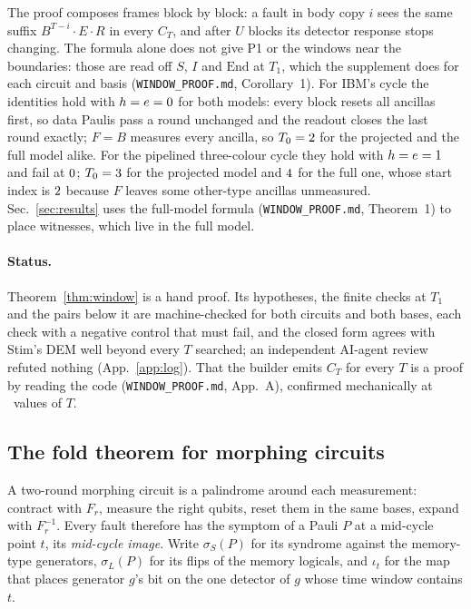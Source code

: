 \documentclass[aps,pra,twocolumn,superscriptaddress,nofootinbib,longbibliography,floatfix]{revtex4-2}
\begin{document}
The proof composes frames block by block: a fault in body copy $i$ sees the same suffix $B^{T-i}\cdot E\cdot R$ in every $C_T$, and after $U$ blocks its detector response stops changing. The formula alone does not give P1 or the windows near the boundaries: those are read off $S$, $I$ and $\mathrm{End}$ at $T_1$, which the supplement does for each circuit and basis (\texttt{WINDOW\_PROOF.md}, Corollary~1). For IBM's cycle the identities hold with $h=e=0$ for both models: every block resets all ancillas first, so data Paulis pass a round unchanged and the readout closes the last round exactly; $F=B$ measures every ancilla, so $T_0=2$ for the projected and the full model alike. For the pipelined three-colour cycle they hold with $h=e=1$ and fail at $0$; $T_0=3$ for the projected model and $4$ for the full one, whose start index is $2$ because $F$ leaves some other-type ancillas unmeasured. Sec.~\ref{sec:results} uses the full-model formula (\texttt{WINDOW\_PROOF.md}, Theorem~1) to place witnesses, which live in the full model.

\paragraph*{Status.} Theorem~\ref{thm:window} is a hand proof. Its hypotheses, the finite checks at $T_1$ and the pairs below it are machine-checked for both circuits and both bases, each check with a negative control that must fail, and the closed form agrees with Stim's DEM well beyond every $T$ searched; an independent AI-agent review refuted nothing (App.~\ref{app:log}). That the builder emits $C_T$ for every $T$ is a proof by reading the code (\texttt{WINDOW\_PROOF.md}, App.~A), confirmed mechanically at \WinTplCount\ values of $T$.

\subsection{The fold theorem for morphing circuits}
\label{sec:fold}

A two-round morphing circuit is a palindrome around each measurement: contract with $F_r$, measure the right qubits, reset them in the same bases, expand with $F_r^{-1}$. Every fault therefore has the symptom of a Pauli $P$ at a mid-cycle point $t$, its \emph{mid-cycle image}. Write $\sigma_S(P)$ for its syndrome against the memory-type generators, $\sigma_L(P)$ for its flips of the memory logicals, and $\iota_t$ for the map that places generator $g$'s bit on the one detector of $g$ whose time window contains $t$.
\end{document}
